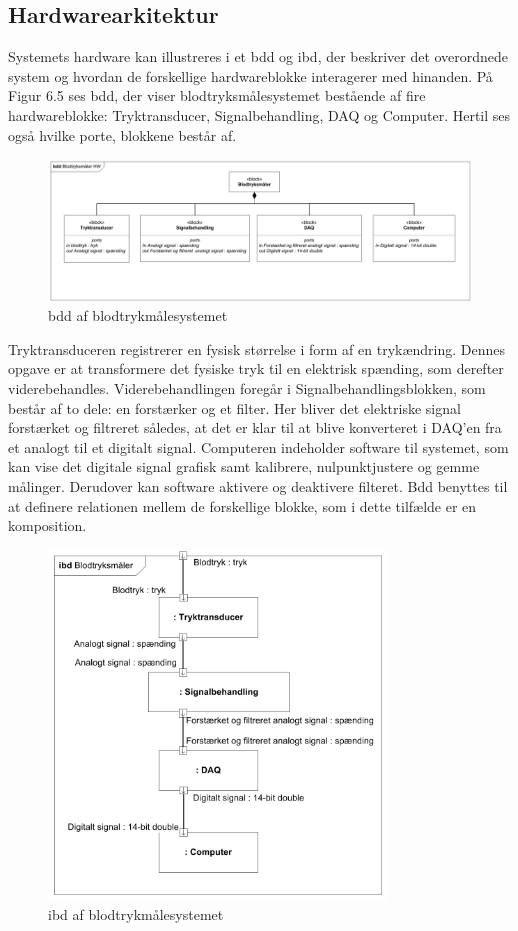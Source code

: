 \subsection{Hardwarearkitektur}
Systemets hardware kan illustreres i et bdd og ibd, der beskriver det overordnede system og hvordan de forskellige hardwareblokke interagerer med hinanden. På Figur 6.5 ses bdd, der viser blodtryksmålesystemet bestående af fire hardwareblokke: Tryktransducer, Signalbehandling, DAQ og Computer. Hertil ses også hvilke porte, blokkene består af.
\begin{figure}[H]
	\centering
	\includegraphics[width=1\textwidth]{Figurer/Snip20151209_70}
	\caption{bdd af blodtrykmålesystemet}
\end{figure}
Tryktransduceren registrerer en fysisk størrelse i form af en trykændring. Dennes opgave er at transformere det fysiske tryk til en elektrisk spænding, som derefter viderebehandles. Viderebehandlingen foregår i Signalbehandlingsblokken, som består af to dele: en forstærker og et filter. Her bliver det elektriske signal forstærket og filtreret således, at det er klar til at blive konverteret i DAQ’en fra et analogt til et digitalt signal. Computeren indeholder software til systemet, som kan vise det digitale signal grafisk samt kalibrere, nulpunktjustere og gemme målinger. Derudover kan software aktivere og deaktivere filteret.  
Bdd benyttes til at definere relationen mellem de forskellige blokke, som i dette tilfælde er en komposition. 
\begin{figure}[H]
	\centering
	\includegraphics[width=0.8\textwidth]{Figurer/Snip20151209_72}
	\caption{ibd af blodtrykmålesystemet}
\end{figure}
